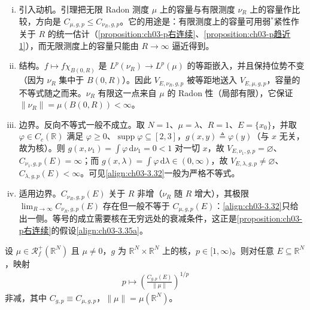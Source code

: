 \documentclass[../../main.tex]{subfiles}%
\begin{document}
\begin{remark}\label{remark:ch03-有限测度比较}
\begin{enumerate}[(i)]
\item 引入动机。引理把无限 Radon 测度 $\mu$ 上的容量与有限测度 $\nu_R$ 上的容量作比较，方向是 $C_{\mu,g,p}\leqslant C_{\nu_R,g,p}$。它的用途是：有限测度上的容量可用弱$^*$紧性作关于 $R$ 的统一估计（\cref{proposition:ch03-p右连续}、\cref{proposition:ch03-p趋近1}），而无限测度上的容量只能由 $R\to\infty$ 逼近得到。

\item 结构。$f\mapsto f\chi_{B(0,R)}$ 是 $L^p(\nu_R)\to L^p(\mu)$ 的等距嵌入，并且保持位势不变（因为 $\nu_R$ 集中于 $B(0,R)$）。因此 $V_{E,\nu_R,g,p}$ 被等距地送入 $V_{E,\mu,g,p}$，容量的不等式随之而来。$\nu_R$ 有限这一点来自 $\mu$ 的 Radon 性（局部有限），它保证 $\|\nu_R\|=\mu(B(0,R))<\infty$。

\item 边界。反向不等式一般不成立。取 $N=1$、$\mu=\lambda$、$R=1$、$E=\{x_0\}$，并取 $\varphi\in C_c(\mathbb{R})$ 满足 $\varphi\geqslant0$、$\operatorname{supp}\varphi\subseteq[2,3]$，$g(x,y)\triangleq\varphi(y)$（与 $x$ 无关，故为核）。则 $g(x,\nu_1)=\int\varphi\,\mathrm{d}\nu_1=0<1$ 对一切 $x$，故 $V_{E,\nu_1,g,p}=\varnothing$、$C_{\nu_1,g,p}(E)=\infty$；而 $g(x,\lambda)=\int\varphi\,\mathrm{d}\lambda\in(0,\infty)$，故 $V_{E,\lambda,g,p}\neq\varnothing$、$C_{\lambda,g,p}(E)<\infty$。可见\eqref{align:ch03-3.32}一般为严格不等式。

\item 适用边界。$C_{\nu_R,g,p}(E)$ 关于 $R$ 非增（$\nu_R$ 随 $R$ 增大），其极限 $\lim_{R\to\infty}C_{\nu_R,g,p}(E)$ 存在但一般不等于 $C_{\mu,g,p}(E)$：\eqref{align:ch03-3.32}只给出一侧。等号的成立需要核在无穷远处的衰减条件，这正是\cref{proposition:ch03-p右连续}的假设\eqref{align:ch03-3.35a}。
\end{enumerate}
\end{remark}

\begin{lemma}\label{lemma:ch03-规范单调}
设 $\mu\in\mathscr{R}^+_f(\mathbb{R}^N)$ 且 $\mu\neq0$，$g$ 为 $\mathbb{R}^N\times\mathbb{R}^N$ 上的核，$p\in[1,\infty)$。则对任意 $E\subseteq\mathbb{R}^N$，映射
\begin{align*}
p\mapsto\left(\frac{C_{g,p}(E)}{\|\mu\|}\right)^{1/p}
\end{align*}
非减，其中 $C_{g,p}\equiv C_{\mu,g,p}$，$\|\mu\|=\mu(\mathbb{R}^N)$。
\end{lemma}
\end{document}

